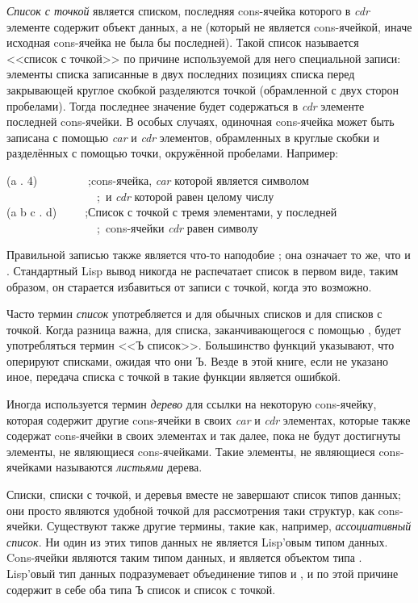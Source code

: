 \emph{Список с точкой} является списком, последняя cons-ячейка которого в {\it
  cdr} элементе содержит
объект данных, а не {\nil} (который не является
cons-ячейкой, иначе исходная cons-ячейка не была бы последней).
Такой список называется <<список с точкой>> по причине используемой для него
специальной записи: элементы списка записанные в двух последних позициях списка
перед закрывающей круглое скобкой разделяются точкой (обрамленной с двух сторон
пробелами). Тогда последнее значение будет содержаться в \emph{cdr} элементе
последней cons-ячейки. В особых случаях, одиночная cons-ячейка может быть
записана с помощью \emph{car} и \emph{cdr} элементов, обрамленных в круглые скобки
и разделённых с помощью точки, окружённой пробелами. 
Например:
\begin{lisp}
(a . 4)~~~~~~~~~;\textrm{cons-ячейка, \emph{car} которой является символом} \\
~~~~~~~~~~~~~~~~;~\textrm{и \emph{cdr} которой равен целому числу} \\
(a b c . d)~~~~~;\textrm{Список с точкой с тремя элементами, у последней} \\
~~~~~~~~~~~~~~~~;~\textrm{cons-ячейки \emph{cdr} равен символу }
\end{lisp}

Правильной записью также является что-то наподобие ;
она означает то же, что и . Стандартный Lisp вывод никогда не
распечатает список в первом виде, таким образом, он старается избавиться от
записи с точкой, когда это возможно.

Часто термин \emph{список} употребляется и для обычных списков и для списков с
точкой. Когда разница важна, для списка, заканчивающегося с помощью {\nil},
будет употребляться термин <<Ъ список>>. Большинство функций указывают, что
оперируют списками, ожидая что они Ъ. Везде в этой книге, если не указано иное,
передача списка с точкой в такие функции является ошибкой.

Иногда используется термин \emph{дерево} для ссылки на некоторую cons-ячейку,
которая содержит другие cons-ячейки в своих \emph{car} и \emph{cdr} элементах,
которые также содержат cons-ячейки в своих элементах и так далее, пока не будут
достигнуты элементы, не являющиеся cons-ячейками.
Такие элементы, не являющиеся cons-ячейками называются \emph{листьями} дерева.

Списки, списки с точкой, и деревья вместе не завершают список типов данных;
они просто являются удобной точкой для рассмотрения таки структур, как
cons-ячейки.
Существуют также другие термины, такие как, например, \emph{ассоциативный
  список}. Ни один из этих типов данных не является Lisp'овым типом
данных. Cons-ячейки являются таким типом данных, и {\nil} является объектом типа
. Lisp'овый тип данных  подразумевает объединение типов
 и , и по этой причине содержит в себе оба типа Ъ
список и список с точкой.

